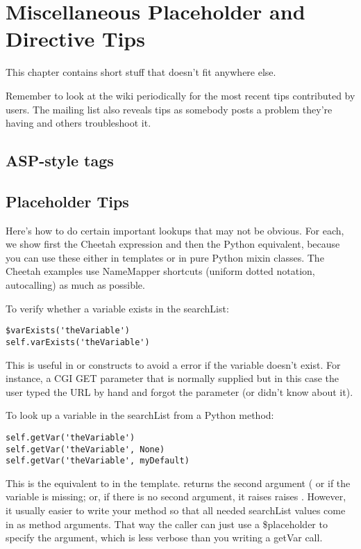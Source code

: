\section{Miscellaneous Placeholder and Directive Tips}
\label{tips}

This chapter contains short stuff that doesn't fit anywhere else.

Remember to look at the wiki periodically for the most recent tips contributed
by users.  The mailing list also reveals tips as somebody posts a problem
they're having and others troubleshoot it.

\subsection{ASP-style tags}
\label{tips.ASP}

\subsection{Placeholder Tips}
\label{tips.placeholder}

Here's how to do certain important lookups that may not be obvious.
For each, we show first the Cheetah expression and then the Python equivalent,
because you can use these either in templates or in pure Python mixin classes.
The Cheetah examples use NameMapper shortcuts (uniform dotted notation, 
autocalling) as much as possible.

To verify whether a variable exists in the searchList:
\begin{verbatim}
$varExists('theVariable')
self.varExists('theVariable')
\end{verbatim}
This is useful in  or  constructs to avoid a
 error if the variable doesn't exist.  For instance,
a CGI GET parameter that is normally supplied but in this case the user typed
the URL by hand and forgot the parameter (or didn't know about it).

To look up a variable in the searchList from a Python method:
\begin{verbatim}
self.getVar('theVariable')
self.getVar('theVariable', None)
self.getVar('theVariable', myDefault)
\end{verbatim}
This is the equivalent to  in the template.  
returns the second argument ( or  if the variable is
missing; or, if there is no second argument, it raises raises
.  However, it usually easier to write your method
so that all needed searchList values come in as method arguments.  That way
the caller can just use a \$placeholder to specify the argument, which is
less verbose than you writing a getVar call.

